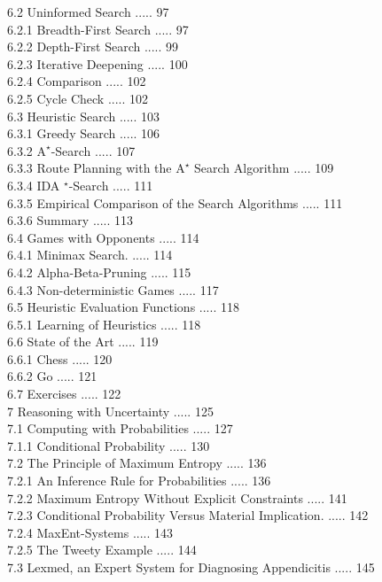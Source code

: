 \documentclass[10pt]{article}
\begin{document}
6.2 Uninformed Search ..... 97\\
6.2.1 Breadth-First Search ..... 97\\
6.2.2 Depth-First Search ..... 99\\
6.2.3 Iterative Deepening ..... 100\\
6.2.4 Comparison ..... 102\\
6.2.5 Cycle Check ..... 102\\
6.3 Heuristic Search ..... 103\\
6.3.1 Greedy Search ..... 106\\
6.3.2 $\mathrm{A}^{\star}$-Search ..... 107\\
6.3.3 Route Planning with the $\mathrm{A}^{\star}$ Search Algorithm ..... 109\\
6.3.4 IDA $^{\star}$-Search ..... 111\\
6.3.5 Empirical Comparison of the Search Algorithms ..... 111\\
6.3.6 Summary ..... 113\\
6.4 Games with Opponents ..... 114\\
6.4.1 Minimax Search. ..... 114\\
6.4.2 Alpha-Beta-Pruning ..... 115\\
6.4.3 Non-deterministic Games ..... 117\\
6.5 Heuristic Evaluation Functions ..... 118\\
6.5.1 Learning of Heuristics ..... 118\\
6.6 State of the Art ..... 119\\
6.6.1 Chess ..... 120\\
6.6.2 Go ..... 121\\
6.7 Exercises ..... 122\\
7 Reasoning with Uncertainty ..... 125\\
7.1 Computing with Probabilities ..... 127\\
7.1.1 Conditional Probability ..... 130\\
7.2 The Principle of Maximum Entropy ..... 136\\
7.2.1 An Inference Rule for Probabilities ..... 136\\
7.2.2 Maximum Entropy Without Explicit Constraints ..... 141\\
7.2.3 Conditional Probability Versus Material Implication. ..... 142\\
7.2.4 MaxEnt-Systems ..... 143\\
7.2.5 The Tweety Example ..... 144\\
7.3 Lexmed, an Expert System for Diagnosing Appendicitis ..... 145\\
\end{document}
